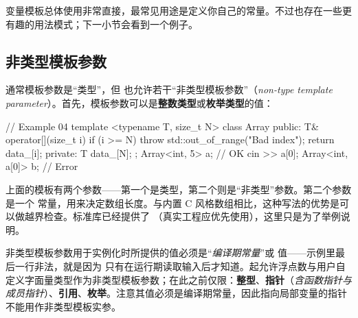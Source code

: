 变量模板总体使用非常直接，最常见用途是定义你自己的常量。不过也存在一些更有趣的用法模式；下一小节会看到一个例子。

\subsection{非类型模板参数}
通常模板参数是“类型”，但 \cppsign{} 也允许若干“非类型模板参数”（\emph{non-type template parameter}）。首先，模板参数可以是\textbf{整数类型}或\textbf{枚举类型}的值：

\begin{code}
// Example 04
template <typename T, size_t N> 
class Array {
  public:
  T& operator[](size_t i) {
    if (i >= N) throw std::out_of_range("Bad index");
     return data_[i];
  }
  private:
  T data_[N];
};
Array<int, 5> a;      // OK
cin >> a[0];
Array<int, a[0]> b;   // Error
\end{code}

上面的模板有两个参数——第一个是类型，第二个则是“非类型”参数。第二个参数是一个  常量，用来决定数组长度。与内置 C 风格数组相比，这种写法的优势是可以做越界检查。标准库已经提供了 （真实工程应优先使用），这里只是为了举例说明。

非类型模板参数用于实例化时所提供的值必须是“\emph{编译期常量}”或  值——示例里最后一行非法，就是因为  只有在运行期读取输入后才知道。\cpp[20] 起允许浮点数与用户自定义字面量类型作为非类型模板参数；在此之前仅限：\textbf{整型}、\textbf{指针}（\emph{含函数指针与成员指针}）、\textbf{引用}、\textbf{枚举}。注意其值必须是编译期常量，因此指向局部变量的指针不能用作非类型模板实参。

